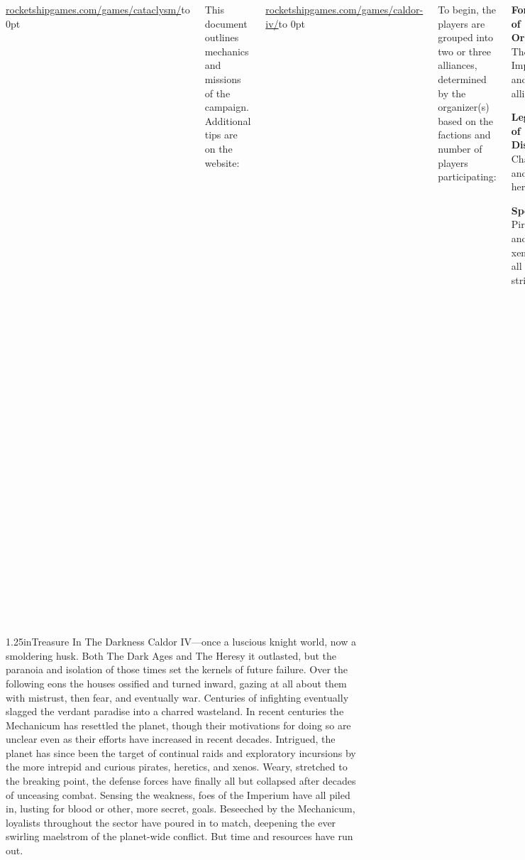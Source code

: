 \begin{columns}
\begin{squishitemize}
\hfill\url{rocketshipgames.com/games/cataclysm/}\hfill\hbox to 0pt{}
\end{squishitemize}

This document outlines mechanics and missions of the campaign.
Additional tips are on the website:

\hfill\url{rocketshipgames.com/games/caldor-iv/}\hfill\hbox to 0pt{}


To begin, the players are grouped into two or three alliances,
determined by the organizer(s) based on the factions and number of
players participating:

\begin{squishitemize}
\item \textbf{Forces of Order:} The Imperium and its allies;
\item \textbf{Legions of Discord:} Chaos and heretics;
\item \textbf{Spoilers:} Pirates and xenos of all stripes.
\end{squishitemize}

If only two alliances are warranted by the campaign group, they should
play as Order and Discord.

At the outset of the campaign the Legions of Discord have descended on
Caldor IV en masse in search of \emph{The Scythe Of Unbound Light}, an
ancient weapon of storied power.  Under siege, the Forces of Order are
about to abandon Caldor IV entirely and scorch everything and everyone
left behind.  First, however, the Mechanicum's Magos Ferdinand,
ranking figure on the world, must be retrieved.  Unaware of the true
stakes, the Spoilers have come simply for bloodshed and whatever they
can plunder.

\end{columns}

\vfill
\begin{story}{1.25in}{Treasure In The Darkness}
  Caldor IV---once a luscious knight world, now a smoldering
  husk. Both The Dark Ages and The Heresy it outlasted, but the
  paranoia and isolation of those times set the kernels of future
  failure.  Over the following eons the houses ossified and turned
  inward, gazing at all about them with mistrust, then fear, and
  eventually war.  Centuries of infighting eventually slagged the
  verdant paradise into a charred wasteland.  In recent centuries the
  Mechanicum has resettled the planet, though their motivations for
  doing so are unclear even as their efforts have increased in recent
  decades.  Intrigued, the planet has since been the target of
  continual raids and exploratory incursions by the more intrepid and
  curious pirates, heretics, and xenos.  Weary, stretched to the
  breaking point, the defense forces have finally all but collapsed
  after decades of unceasing combat.  Sensing the weakness, foes of
  the Imperium have all piled in, lusting for blood or other, more
  secret, goals.  Beseeched by the Mechanicum, loyalists throughout
  the sector have poured in to match, deepening the ever swirling
  maelstrom of the planet-wide conflict.  But time and resources have
  run out.
\end{story}
